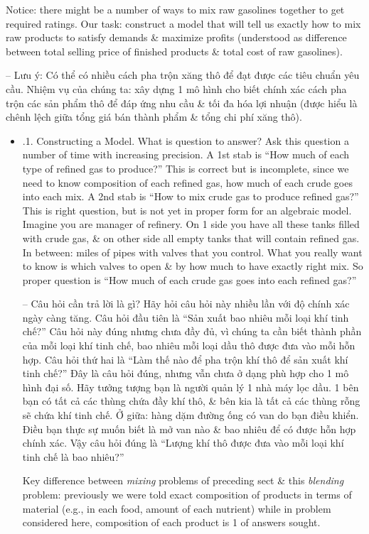 \documentclass{article}
\begin{document}
\begin{itemize}
\begin{itemize}
        Notice: there might be a number of ways to mix raw gasolines together to get required ratings. Our task: construct a model that will tell us exactly how to mix raw products to satisfy demands \& maximize profits (understood as difference between total selling price of finished products \& total cost of raw gasolines).

        -- Lưu ý: Có thể có nhiều cách pha trộn xăng thô để đạt được các tiêu chuẩn yêu cầu. Nhiệm vụ của chúng ta: xây dựng 1 mô hình cho biết chính xác cách pha trộn các sản phẩm thô để đáp ứng nhu cầu \& tối đa hóa lợi nhuận (được hiểu là chênh lệch giữa tổng giá bán thành phẩm \& tổng chi phí xăng thô).
        \begin{itemize}
            \item {.1. Constructing a Model.} What is question to answer? Ask this question a number of time with increasing precision. A 1st stab is ``How much of each type of refined gas to produce?'' This is correct but is incomplete, since we need to know composition of each refined gas, how much of each crude goes into each mix. A 2nd stab is ``How to mix crude gas to produce refined gas?'' This is right question, but is not yet in proper form for an algebraic model. Imagine you are manager of refinery. On 1 side you have all these tanks filled with crude gas, \& on other side all empty tanks that will contain refined gas. In between: miles of pipes with valves that you control. What you really want to know is which valves to open \& by how much to have exactly right mix. So proper question is ``How much of each crude gas goes into each refined gas?''

            -- Câu hỏi cần trả lời là gì? Hãy hỏi câu hỏi này nhiều lần với độ chính xác ngày càng tăng. Câu hỏi đầu tiên là ``Sản xuất bao nhiêu mỗi loại khí tinh chế?'' Câu hỏi này đúng nhưng chưa đầy đủ, vì chúng ta cần biết thành phần của mỗi loại khí tinh chế, bao nhiêu mỗi loại dầu thô được đưa vào mỗi hỗn hợp. Câu hỏi thứ hai là ``Làm thế nào để pha trộn khí thô để sản xuất khí tinh chế?'' Đây là câu hỏi đúng, nhưng vẫn chưa ở dạng phù hợp cho 1 mô hình đại số. Hãy tưởng tượng bạn là người quản lý 1 nhà máy lọc dầu. 1 bên bạn có tất cả các thùng chứa đầy khí thô, \& bên kia là tất cả các thùng rỗng sẽ chứa khí tinh chế. Ở giữa: hàng dặm đường ống có van do bạn điều khiển. Điều bạn thực sự muốn biết là mở van nào \& bao nhiêu để có được hỗn hợp chính xác. Vậy câu hỏi đúng là ``Lượng khí thô được đưa vào mỗi loại khí tinh chế là bao nhiêu?''

            Key difference between {\it mixing} problems of preceding sect \& this {\it blending} problem: previously we were told exact composition of products in terms of material (e.g., in each food, amount of each nutrient) while in problem considered here, composition of each product is 1 of answers sought.


\end{itemize}
\end{itemize}
\end{itemize}
\end{document}
